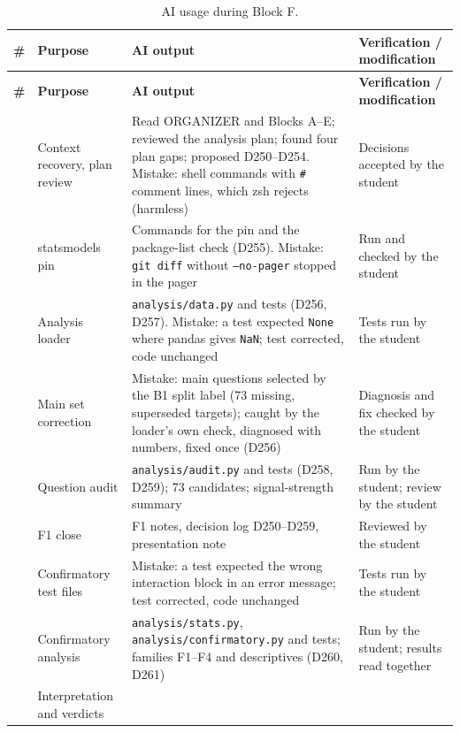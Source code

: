 \documentclass[11pt,a4paper]{report}
\begin{document}
{\small
\renewcommand{\arraystretch}{1.25}
\begin{longtable}{
  >{\raggedright\arraybackslash}p{0.6cm}
  >{\raggedright\arraybackslash}p{4.4cm}
  >{\raggedright\arraybackslash}p{4.4cm}
  >{\raggedright\arraybackslash}p{4.8cm}}
\caption{AI usage during Block F.}\label{tab:ailog-f}\\
\toprule
\textbf{\#} & \textbf{Purpose} & \textbf{AI output} & \textbf{Verification / modification} \\
\midrule
\endfirsthead
\toprule
\textbf{\#} & \textbf{Purpose} & \textbf{AI output} & \textbf{Verification / modification} \\
\midrule
\endhead
\bottomrule
\endfoot
170 & Context recovery, plan review
  & Read ORGANIZER and Blocks A--E; reviewed the analysis plan; found four plan gaps; proposed D250--D254. Mistake: shell commands with \texttt{\#} comment lines, which zsh rejects (harmless)
  & Decisions accepted by the student \\
171 & statsmodels pin
  & Commands for the pin and the package-list check (D255). Mistake: \texttt{git diff} without \texttt{--no-pager} stopped in the pager
  & Run and checked by the student \\
172 & Analysis loader
  & \texttt{analysis/data.py} and tests (D256, D257). Mistake: a test expected \texttt{None} where pandas gives \texttt{NaN}; test corrected, code unchanged
  & Tests run by the student \\
173 & Main set correction
  & Mistake: main questions selected by the B1 split label (73 missing, superseded targets); caught by the loader's own check, diagnosed with numbers, fixed once (D256)
  & Diagnosis and fix checked by the student \\
174 & Question audit
  & \texttt{analysis/audit.py} and tests (D258, D259); 73 candidates; signal-strength summary
  & Run by the student; review by the student \\
175 & F1 close
  & F1 notes, decision log D250--D259, presentation note
  & Reviewed by the student \\
176 & Confirmatory test files
  & Mistake: a test expected the wrong interaction block in an error message; test corrected, code unchanged
  & Tests run by the student \\
177 & Confirmatory analysis
  & \texttt{analysis/stats.py}, \texttt{analysis/confirmatory.py} and tests; families F1--F4 and descriptives (D260, D261)
  & Run by the student; results read together \\
178 & Interpretation and verdicts

\end{longtable}}
\end{document}
